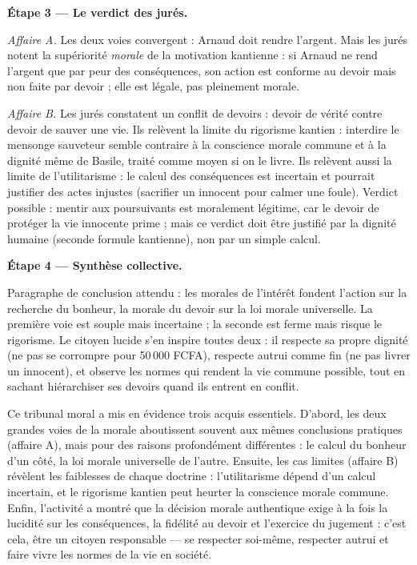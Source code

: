 \documentclass[11pt]{article}
\newcounter{popsec}
\newcounter{popsub}
\newcommand{\courssub}[1]{%
  \stepcounter{popsub}%
  \par\vspace{9pt}\noindent{\popxbold\fontsize{11.5}{13}\selectfont\color{popink}{\color{poporange}\thepopsec.\thepopsub}\hspace{6pt}#1}\par\nopagebreak\vspace{4pt}
}
\begin{document}
\begin{exoresolu}
\textbf{Étape 3 — Le verdict des jurés.}

\emph{Affaire A.} Les deux voies convergent : Arnaud doit rendre l'argent. Mais les jurés notent la supériorité \emph{morale} de la motivation kantienne : si Arnaud ne rend l'argent que par peur des conséquences, son action est conforme au devoir mais non faite par devoir ; elle est légale, pas pleinement morale.

\emph{Affaire B.} Les jurés constatent un conflit de devoirs : devoir de vérité contre devoir de sauver une vie. Ils relèvent la limite du rigorisme kantien : interdire le mensonge sauveteur semble contraire à la conscience morale commune et à la dignité même de Basile, traité comme moyen si on le livre. Ils relèvent aussi la limite de l'utilitarisme : le calcul des conséquences est incertain et pourrait justifier des actes injustes (sacrifier un innocent pour calmer une foule). Verdict possible : mentir aux poursuivants est moralement légitime, car le devoir de protéger la vie innocente prime ; mais ce verdict doit être justifié par la dignité humaine (seconde formule kantienne), non par un simple calcul.

\textbf{Étape 4 — Synthèse collective.}

Paragraphe de conclusion attendu : les morales de l'intérêt fondent l'action sur la recherche du bonheur, la morale du devoir sur la loi morale universelle. La première voie est souple mais incertaine ; la seconde est ferme mais risque le rigorisme. Le citoyen lucide s'en inspire toutes deux : il respecte sa propre dignité (ne pas se corrompre pour 50\,000 FCFA), respecte autrui comme fin (ne pas livrer un innocent), et observe les normes qui rendent la vie commune possible, tout en sachant hiérarchiser ses devoirs quand ils entrent en conflit.
\end{exoresolu}

\courssub{Bilan de l'activité}

Ce tribunal moral a mis en évidence trois acquis essentiels. D'abord, les deux grandes voies de la morale aboutissent souvent aux mêmes conclusions pratiques (affaire A), mais pour des raisons profondément différentes : le calcul du bonheur d'un côté, la loi morale universelle de l'autre. Ensuite, les cas limites (affaire B) révèlent les faiblesses de chaque doctrine : l'utilitarisme dépend d'un calcul incertain, et le rigorisme kantien peut heurter la conscience morale commune. Enfin, l'activité a montré que la décision morale authentique exige à la fois la lucidité sur les conséquences, la fidélité au devoir et l'exercice du jugement : c'est cela, être un citoyen responsable — se respecter soi-même, respecter autrui et faire vivre les normes de la vie en société.
\end{document}
